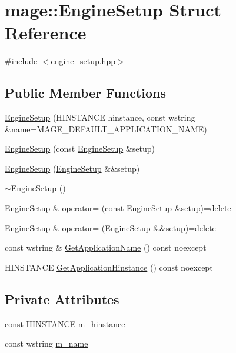 \hypertarget{structmage_1_1_engine_setup}{}\section{mage\+:\+:Engine\+Setup Struct Reference}
\label{structmage_1_1_engine_setup}


{\ttfamily \#include $<$engine\+\_\+setup.\+hpp$>$}

\subsection*{Public Member Functions}
\begin{DoxyCompactItemize}
\item 
\hyperlink{structmage_1_1_engine_setup_ac09a572abaf5f785004bb46a1d1bf49c}{Engine\+Setup} (H\+I\+N\+S\+T\+A\+N\+CE hinstance, const wstring \&name=M\+A\+G\+E\+\_\+\+D\+E\+F\+A\+U\+L\+T\+\_\+\+A\+P\+P\+L\+I\+C\+A\+T\+I\+O\+N\+\_\+\+N\+A\+ME)
\item 
\hyperlink{structmage_1_1_engine_setup_a2399c7966ed02ce9e9ab951b7483aac1}{Engine\+Setup} (const \hyperlink{structmage_1_1_engine_setup}{Engine\+Setup} \&setup)
\item 
\hyperlink{structmage_1_1_engine_setup_ac199c03ba1968ca0a98a2de48cfb952d}{Engine\+Setup} (\hyperlink{structmage_1_1_engine_setup}{Engine\+Setup} \&\&setup)
\item 
\hyperlink{structmage_1_1_engine_setup_ac9ec3df257c585930b21b2b69c99c177}{$\sim$\+Engine\+Setup} ()
\item 
\hyperlink{structmage_1_1_engine_setup}{Engine\+Setup} \& \hyperlink{structmage_1_1_engine_setup_ad7066882519b59ca533293f743334508}{operator=} (const \hyperlink{structmage_1_1_engine_setup}{Engine\+Setup} \&setup)=delete
\item 
\hyperlink{structmage_1_1_engine_setup}{Engine\+Setup} \& \hyperlink{structmage_1_1_engine_setup_a9ca25ff88af30786022964916790a497}{operator=} (\hyperlink{structmage_1_1_engine_setup}{Engine\+Setup} \&\&setup)=delete
\item 
const wstring \& \hyperlink{structmage_1_1_engine_setup_ab79015dba68069256ed42595b30a5728}{Get\+Application\+Name} () const noexcept
\item 
H\+I\+N\+S\+T\+A\+N\+CE \hyperlink{structmage_1_1_engine_setup_a2d6377386d47058252d77d168d5e60ec}{Get\+Application\+Hinstance} () const noexcept
\end{DoxyCompactItemize}
\subsection*{Private Attributes}
\begin{DoxyCompactItemize}
\item 
const H\+I\+N\+S\+T\+A\+N\+CE \hyperlink{structmage_1_1_engine_setup_a678360078479bc3fee6bed4617caebbf}{m\+\_\+hinstance}
\item 
const wstring \hyperlink{structmage_1_1_engine_setup_a40fba981d4b1c30eff304b029a013009}{m\+\_\+name}
\end{DoxyCompactItemize}


